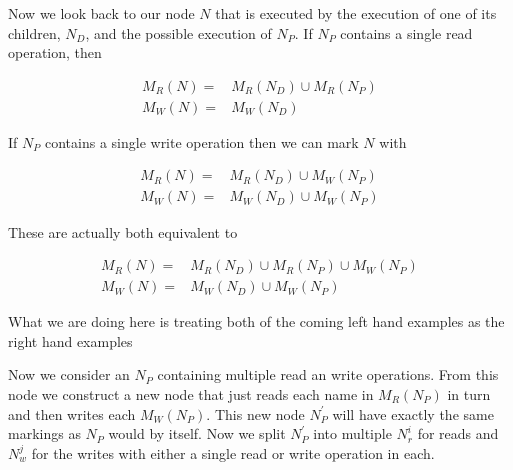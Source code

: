 \documentclass{report}
\begin{document}
Now we look back to our node $N$ that is executed by the execution of one of its children, $N_D$, and the possible execution of $N_P$. If $N_P$
contains a single read operation, then

\begin{align*}
M_R(N) =& M_R(N_D) \cup M_R(N_P) \\
M_W(N) =& M_W(N_D)
\end{align*}

If $N_P$ contains a single write operation then we can mark $N$ with

\begin{align*}
M_R(N) =& M_R(N_D) \cup M_W(N_P) \\
M_W(N) =& M_W(N_D) \cup M_W(N_P)
\end{align*}

These are actually both equivalent to

\begin{align*}
M_R(N) =& M_R(N_D) \cup M_R(N_P) \cup M_W(N_P) \\
M_W(N) =& M_W(N_D) \cup M_W(N_P)
\end{align*}

What we are doing here is treating both of the coming left hand examples as the right hand examples

\begin{minipage}[b]{0.4\linewidth}
\centering

\end{minipage}
\hspace{1cm}
\begin{minipage}[b]{0.5\linewidth}
\centering

\end{minipage}

\begin{minipage}[b]{0.4\linewidth}
\centering

\end{minipage}
\hspace{1cm}
\begin{minipage}[b]{0.5\linewidth}
\centering

\end{minipage}

Now we consider an $N_P$ containing multiple read an write operations. From this node we construct a new node that just reads each name in $M_R(N_P)$ in turn
and then writes each $M_W(N_P)$. This new node $N_P^\prime$ will have exactly the same markings as $N_P$ would by itself. Now we split $N_P^\prime$ into 
multiple $N_r^i$ for reads and $N_w^j$ for the writes with either a single read or write operation in each.
\end{document}
